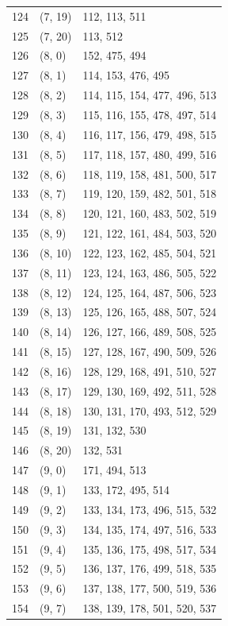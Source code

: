 \documentclass{article}
\begin{document}
\begin{longtable}{lll}
  124 & (7, 19) & 112, 113, 511 \\
  125 & (7, 20) & 113, 512 \\
  126 & (8, 0) & 152, 475, 494 \\
  127 & (8, 1) & 114, 153, 476, 495 \\
  128 & (8, 2) & 114, 115, 154, 477, 496, 513 \\
  129 & (8, 3) & 115, 116, 155, 478, 497, 514 \\
  130 & (8, 4) & 116, 117, 156, 479, 498, 515 \\
  131 & (8, 5) & 117, 118, 157, 480, 499, 516 \\
  132 & (8, 6) & 118, 119, 158, 481, 500, 517 \\
  133 & (8, 7) & 119, 120, 159, 482, 501, 518 \\
  134 & (8, 8) & 120, 121, 160, 483, 502, 519 \\
  135 & (8, 9) & 121, 122, 161, 484, 503, 520 \\
  136 & (8, 10) & 122, 123, 162, 485, 504, 521 \\
  137 & (8, 11) & 123, 124, 163, 486, 505, 522 \\
  138 & (8, 12) & 124, 125, 164, 487, 506, 523 \\
  139 & (8, 13) & 125, 126, 165, 488, 507, 524 \\
  140 & (8, 14) & 126, 127, 166, 489, 508, 525 \\
  141 & (8, 15) & 127, 128, 167, 490, 509, 526 \\
  142 & (8, 16) & 128, 129, 168, 491, 510, 527 \\
  143 & (8, 17) & 129, 130, 169, 492, 511, 528 \\
  144 & (8, 18) & 130, 131, 170, 493, 512, 529 \\
  145 & (8, 19) & 131, 132, 530 \\
  146 & (8, 20) & 132, 531 \\
  147 & (9, 0) & 171, 494, 513 \\
  148 & (9, 1) & 133, 172, 495, 514 \\
  149 & (9, 2) & 133, 134, 173, 496, 515, 532 \\
  150 & (9, 3) & 134, 135, 174, 497, 516, 533 \\
  151 & (9, 4) & 135, 136, 175, 498, 517, 534 \\
  152 & (9, 5) & 136, 137, 176, 499, 518, 535 \\
  153 & (9, 6) & 137, 138, 177, 500, 519, 536 \\
  154 & (9, 7) & 138, 139, 178, 501, 520, 537 \\

\end{longtable}
\end{document}

